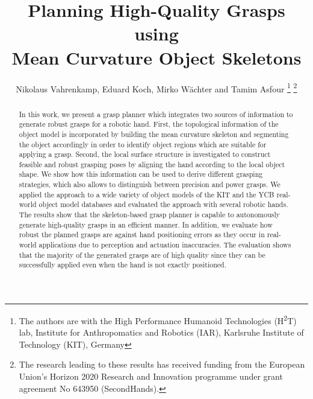 \documentclass[letterpaper, 10 pt, conference]{ieeeconf}  %
\title{\LARGE \bf
Planning High-Quality Grasps using \\Mean Curvature Object Skeletons
}
\author{
Nikolaus Vahrenkamp, Eduard Koch, Mirko W\"achter and Tamim Asfour%
\thanks{The authors are with the High Performance Humanoid Technologies (H\textsuperscript{2}T) lab, Institute for Anthropomatics and Robotics (IAR), Karlsruhe Institute of Technology (KIT), Germany}
\thanks{The research leading to these results has received funding from the European Union’s Horizon 2020 Research and Innovation programme under grant agreement No 643950 (SecondHands).}
}
\begin{document}
\maketitle
\thispagestyle{empty}
\pagestyle{empty}
		
\begin{abstract}
In this work, we present a grasp planner which integrates two sources of information to generate robust grasps for a robotic hand. First, the topological information of the object model is incorporated by building the mean curvature skeleton and segmenting the object accordingly in order to identify object regions which are suitable for applying a grasp.
Second, the local surface structure is investigated to construct feasible and robust grasping poses by aligning the hand according to the local object shape. 
We show how this information can be used to derive different grasping strategies, which also allows to distinguish between precision and power grasps. We applied the approach to a wide variety of object models of the KIT and the YCB real-world object model databases and evaluated the approach with several robotic hands. The results show that the skeleton-based grasp planner is capable to autonomously generate high-quality grasps in an efficient manner. 
In addition, we evaluate how robust the planned grasps are against hand positioning errors as they occur in real-world applications due to perception and actuation inaccuracies. 
The evaluation shows that the majority of the generated grasps are of high quality since they can be successfully applied even when the hand is not exactly positioned.


    \end{abstract}
    
    
\end{document}

